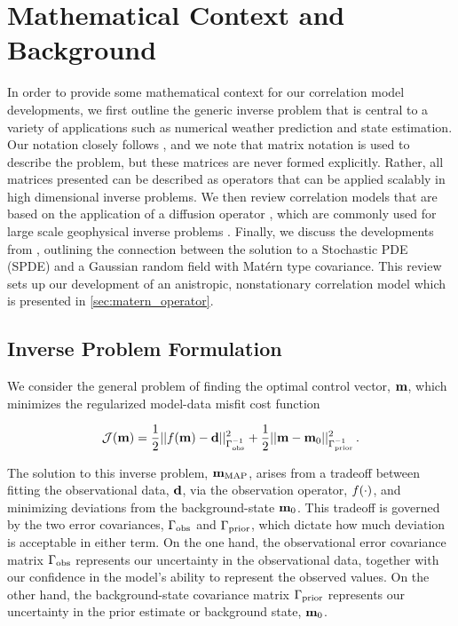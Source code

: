 \section{Mathematical Context and Background}
\label{sec:review}

In order to provide some mathematical context for our correlation model
developments, we first outline the generic inverse problem that is central to
a variety of applications such as numerical weather prediction and state
estimation.
Our notation closely follows \citet{ide_unified_1997}, and we note that matrix
notation is used to describe the problem, but these matrices are never formed
explicitly.
Rather, all matrices presented can be described as operators that can be applied
scalably in high dimensional inverse problems.
We then review correlation models that are based on the application of a
diffusion operator \citep{weaver_correlation_2001,mirouze_representation_2010},
which are commonly used for large scale geophysical inverse problems
\citep[e.g.][]{forgetECCOv4}.
Finally, we discuss the developments from \citet{RSSB:RSSB777}, outlining the
connection between the solution to a Stochastic PDE (SPDE) and a Gaussian random
field with Mat\'ern type covariance.
This review sets up our development of an anistropic, nonstationary correlation
model which is presented in \cref{sec:matern_operator}.


\subsection{Inverse Problem Formulation}
\label{ssec:da_formulation}

We consider the general problem of finding the optimal control vector,
$\mathbf{m}$, which minimizes the regularized model-data misfit cost function
\begin{linenomath*}\begin{equation*}
    \mathcal{J}(\mathbf{m}) =
        \dfrac{1}{2}||f(\mathbf{m}) - \mathbf{d}||_{\Gamma_\text{obs}^{-1}}^2
        +
        \dfrac{1}{2}||\mathbf{m} - \mathbf{m}_{0}||_{\Gamma_{\text{prior}}^{-1}}^2 \, .
\end{equation*}\end{linenomath*}
The solution to this inverse problem, $\mathbf{m}_{\text{MAP}}$, arises from a tradeoff between fitting the
observational data, $\mathbf{d}$, via the observation operator, $f(\cdot)$,
and minimizing deviations from the background-state $\mathbf{m}_{0}$.
This tradeoff is governed by the two error covariances, $\Gamma_\text{obs}$ and
$\Gamma_{\text{prior}}$, which dictate how much deviation is acceptable in either term.
On the one hand, the observational error covariance matrix
$\Gamma_\text{obs}$ represents our uncertainty
in the observational data, together with our confidence in the model's ability
to represent the observed values.
On the other hand, the background-state covariance matrix $\Gamma_{\text{prior}}$
represents our uncertainty in the prior estimate or background state,
$\mathbf{m}_{0}$.

